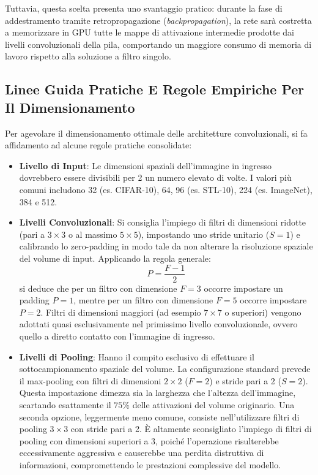 ﻿\documentclass[11pt, a4paper]{article}
\begin{document}
Tuttavia, questa scelta presenta uno svantaggio pratico: durante la fase di addestramento tramite retropropagazione (\emph{backpropagation}), la rete sarà costretta a memorizzare in GPU tutte le mappe di attivazione intermedie prodotte dai livelli convoluzionali della pila, comportando un maggiore consumo di memoria di lavoro rispetto alla soluzione a filtro singolo.

\subsection{Linee Guida Pratiche E Regole Empiriche Per Il Dimensionamento}

Per agevolare il dimensionamento ottimale delle architetture convoluzionali, si fa affidamento ad alcune regole pratiche consolidate:

\begin{itemize}
    \item \textbf{Livello di Input}: Le dimensioni spaziali dell'immagine in ingresso dovrebbero essere divisibili per 2 un numero elevato di volte. I valori più comuni includono 32 (es. CIFAR-10), 64, 96 (es. STL-10), 224 (es. ImageNet), 384 e 512.
    \item \textbf{Livelli Convoluzionali}: Si consiglia l'impiego di filtri di dimensioni ridotte (pari a $3 \times 3$ o al massimo $5 \times 5$), impostando uno stride unitario ($S = 1$) e calibrando lo zero-padding in modo tale da non alterare la risoluzione spaziale del volume di input. Applicando la regola generale:
    \[
    P = \frac{F - 1}{2}
    \]
    si deduce che per un filtro con dimensione $F = 3$ occorre impostare un padding $P = 1$, mentre per un filtro con dimensione $F = 5$ occorre impostare $P = 2$. Filtri di dimensioni maggiori (ad esempio $7 \times 7$ o superiori) vengono adottati quasi esclusivamente nel primissimo livello convoluzionale, ovvero quello a diretto contatto con l'immagine di ingresso.
    \item \textbf{Livelli di Pooling}: Hanno il compito esclusivo di effettuare il sottocampionamento spaziale del volume. La configurazione standard prevede il max-pooling con filtri di dimensioni $2 \times 2$ ($F = 2$) e stride pari a 2 ($S = 2$). Questa impostazione dimezza sia la larghezza che l'altezza dell'immagine, scartando esattamente il $75\%$ delle attivazioni del volume originario. Una seconda opzione, leggermente meno comune, consiste nell'utilizzare filtri di pooling $3 \times 3$ con stride pari a 2. È altamente sconsigliato l'impiego di filtri di pooling con dimensioni superiori a 3, poiché l'operazione risulterebbe eccessivamente aggressiva e causerebbe una perdita distruttiva di informazioni, compromettendo le prestazioni complessive del modello.
\end{itemize}
\end{document}
